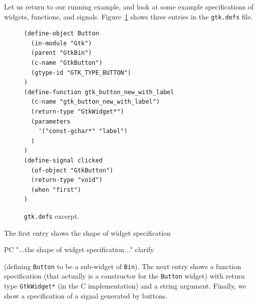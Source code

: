 \documentclass[workingdraft]{usetex-v1}
\begin{document}
Let us return to our running example, and look at some example
specifications of widgets, functions, and signals. Figure~\ref{fig:gtk-defs}
shows three entries in the \texttt{gtk.defs} file.
\begin{figure}[htbp]
\begin{centering}
\begin{verbatim}
(define-object Button
  (in-module "Gtk")
  (parent "GtkBin")
  (c-name "GtkButton")
  (gtype-id "GTK_TYPE_BUTTON")
)
(define-function gtk_button_new_with_label
  (c-name "gtk_button_new_with_label")
  (return-type "GtkWidget*")
  (parameters
    '("const-gchar*" "label")
  )
)
(define-signal clicked
  (of-object "GtkButton")
  (return-type "void")
  (when "first")
)
\end{verbatim}
\caption{\texttt{gtk.defs} excerpt.\label{fig:gtk-defs}}
\end{centering}
\end{figure}
The first entry shows the shape of widget specification 
\begin{ednote}{PC}
  "...the shape of widget specification..." clarify
\end{ednote}
(defining \texttt{Button} to be a sub-widget of \texttt{Bin}). The
next entry shows a function specification (that actually is a
constructor for the \texttt{Button} widget) with return type
\texttt{GtkWidget*} (in the C implementation) and a string argument.
Finally, we show a specification of a signal generated by buttons.








\end{document}
